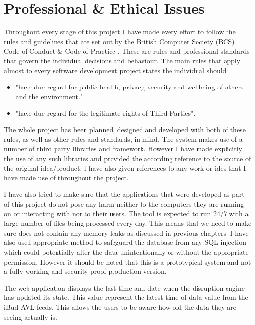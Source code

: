 \chapter{Professional \& Ethical Issues}
Throughout every stage of this project I have made every effort to follow the rules and guidelines that are set out by the British Computer Society (BCS) Code of Conduct \& Code of Practice \cite{bcsCodeOfConduct}. These are rules and professional standards that govern the individual decisions and behaviour. The main rules that apply almost to every software development project states the individual should:
\begin{itemize}
	\item "have due regard for public health, privacy, security and wellbeing of others and
the environment."\cite{bcsCodeOfConduct}
	\item "have due regard for the legitimate rights of Third Parties"\cite{bcsCodeOfConduct}.
\end{itemize}

The whole project has been planned, designed and developed with both of these rules, as well as other rules and standards, in mind. The system makes use of a number of third party libraries and framework. However I have made explicitly the use of any such libraries and provided the according reference to the source of the original idea/product. I have also given references to any work or ides that I have made use of throughout the project.

I have also tried to make sure that the applications that were developed as part of this project do not pose any harm neither to the computers they are running on or interacting with nor to their users. The tool is expected to run 24/7 with a large number of files being processed every day. This means that we need to make sure does not contain any memory leaks as discussed in previous chapters. I have also used appropriate method to safeguard the database from any SQL injection \cite{Su2006} which could potentially alter the data unintentionally or without the appropriate permission. However it should be noted that this is a prototypical system and not a fully working and security proof production version.

The web application displays the last time and date when the disruption engine has updated its state. This value represent the latest time of data value from the iBud AVL feeds. This allows the users to be aware how old the data they are seeing actually is.

